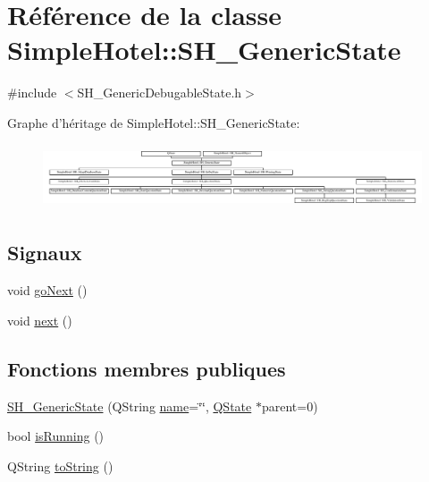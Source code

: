 \hypertarget{classSimpleHotel_1_1SH__GenericState}{\section{Référence de la classe Simple\-Hotel\-:\-:S\-H\-\_\-\-Generic\-State}
\label{classSimpleHotel_1_1SH__GenericState}
}


{\ttfamily \#include $<$S\-H\-\_\-\-Generic\-Debugable\-State.\-h$>$}

Graphe d'héritage de Simple\-Hotel\-:\-:S\-H\-\_\-\-Generic\-State\-:\begin{figure}[H]
\begin{center}
\leavevmode
\includegraphics[height=1.931035cm]{classSimpleHotel_1_1SH__GenericState}
\end{center}
\end{figure}
\subsection*{Signaux}
\begin{DoxyCompactItemize}
\item 
void \hyperlink{classSimpleHotel_1_1SH__GenericState_a5afea8cc17017b08b8db6d51b5bcefc4}{go\-Next} ()
\item 
void \hyperlink{classSimpleHotel_1_1SH__GenericState_a0ff6668857baab63d4f13c4d7175acbd}{next} ()
\end{DoxyCompactItemize}
\subsection*{Fonctions membres publiques}
\begin{DoxyCompactItemize}
\item 
\hyperlink{classSimpleHotel_1_1SH__GenericState_a447410572f03a61d1d3170b55724a2de}{S\-H\-\_\-\-Generic\-State} (Q\-String \hyperlink{classSimpleHotel_1_1SH__NamedObject_ad144716345034c91cface8f3163a799e}{name}=\char`\"{}\char`\"{}, \hyperlink{classQState}{Q\-State} $\ast$parent=0)
\item 
bool \hyperlink{classSimpleHotel_1_1SH__GenericState_a5151ff071129bdd4dcf7c60cb93794da}{is\-Running} ()
\item 
Q\-String \hyperlink{classSimpleHotel_1_1SH__GenericState_adaded78178f9999a9e07a32871af5e61}{to\-String} ()
\end{DoxyCompactItemize}
